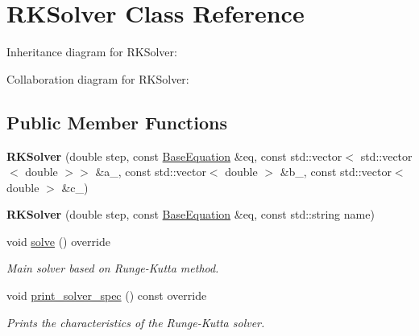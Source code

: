 \hypertarget{classRKSolver}{}\section{R\+K\+Solver Class Reference}
\label{classRKSolver}


Inheritance diagram for R\+K\+Solver\+:


Collaboration diagram for R\+K\+Solver\+:
\subsection*{Public Member Functions}
\begin{DoxyCompactItemize}
\item 
\mbox{\label{classRKSolver_a47393b170acf8f25fb5110448ba4981b}} 
{\bfseries R\+K\+Solver} (double step, const \hyperlink{classBaseEquation}{Base\+Equation} \&eq, const std\+::vector$<$ std\+::vector$<$ double $>$$>$ \&a\+\_\+, const std\+::vector$<$ double $>$ \&b\+\_\+, const std\+::vector$<$ double $>$ \&c\+\_\+)
\item 
\mbox{\label{classRKSolver_aa1b51cd0bb2327b364d3a47f131d8bf0}} 
{\bfseries R\+K\+Solver} (double step, const \hyperlink{classBaseEquation}{Base\+Equation} \&eq, const std\+::string name)
\item 
\mbox{\label{classRKSolver_aa251eaaa56b4ef39d95347579b8a6259}} 
void \hyperlink{classRKSolver_aa251eaaa56b4ef39d95347579b8a6259}{solve} () override
\begin{DoxyCompactList}\small\item\em Main solver based on Runge-\/\+Kutta method. \end{DoxyCompactList}\item 
\mbox{\label{classRKSolver_af7ec0ddafd838e03c9db344a2abd8674}} 
void \hyperlink{classRKSolver_af7ec0ddafd838e03c9db344a2abd8674}{print\+\_\+solver\+\_\+spec} () const override
\begin{DoxyCompactList}\small\item\em Prints the characteristics of the Runge-\/\+Kutta solver. \end{DoxyCompactList}\end{DoxyCompactItemize}
